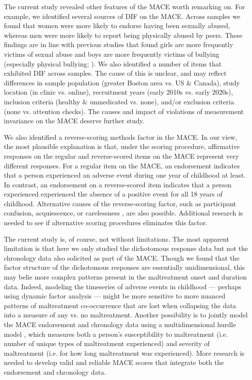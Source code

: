 \documentclass[letterpaper,man,natbib]{apa6}  %
\begin{document}
The current study revealed other features of the MACE worth remarking on. For example, we identified several sources of DIF on the MACE. Across samples we found that women were more likely to endorse having been sexually abused, whereas men were more likely to report being physically abused by peers. These findings are in line with previous studies that found girls are more frequently victims of sexual abuse \citep{stoltenborgh2015prevalence} and boys are more frequently victims of bullying (especially physical bullying; \citealt{scheithauer2006physical}). We also identified a number of items that exhibited DIF across samples. The cause of this is unclear, and may reflect differences in sample population (greater Boston area vs. US \& Canada), study location (in clinic vs. online), recruitment years (early 2010s vs. early 2020s), inclusion criteria (healthy \& unmedicated vs. none), and/or exclusion criteria (none vs. attention checks). The causes and impact of violations of measurement invariance on the MACE deserve further study. 

We also identified a reverse-scoring methods factor in the MACE. In our view, the most plausible explanation is that, under the \cite{teicher2015maltreatment} scoring procedure, affirmative responses on the regular and reverse-scored items on the MACE represent very different responses. For a regular item on the MACE, an endorsement indicates that a person experienced an adverse event during one year of childhood at least. In contrast, an endorsement on a reverse-scored item indicates that a person experienced experienced the absence of a positive event for all 18 years of childhood. Alternative causes of the reverse-scoring factor, such as participant confusion, acquiescence, or carelessness \citep{weijters2013reversed}, are also possible. Additional research is needed to see if alternative scoring procedures eliminates this factor. 

The current study is, of course, not without limitations. The most apparent limitation is that here we only studied the dichotomous response data but not the chronology data also solicited as part of the MACE. Though we found that the factor structure of the dichotomous responses are essentially unidimensional, this may belie more complex patterns present in the maltreatment onset and duration data. Indeed, modeling the timeseries of adverse events in childhood --- perhaps using dynamic factor analysis \citep{zhang2007bayesian} --- might be more sensitive to more nuanced patterns of maltreatment co-occurrence that are lost when collapsing the data into a measure of any vs. no maltreatment. Another possibility is to jointly model the MACE endorsement and chronology data using a multidimensional hurdle model \citep{magnus2021symptom}, which measures both a person's susceptibility to maltreatment (i.e. number of unique types of maltreatment experienced) and severity of maltreatment (i.e. for how long maltreatment was experienced). More research is needed to develop valid and reliable MACE scores that integrate both the endorsement and chronology data. 
\end{document}
